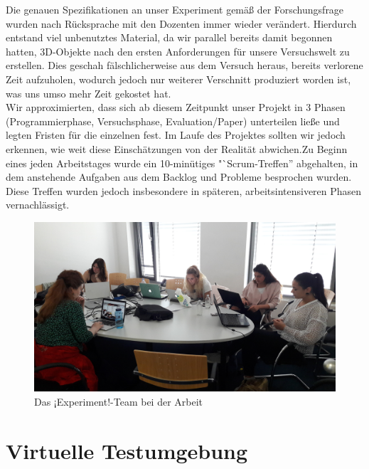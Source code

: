 \documentclass{Bericht}
\begin{document}
		Die genauen Spezifikationen an unser Experiment gemäß der Forschungsfrage wurden nach Rücksprache mit den Dozenten immer wieder verändert. Hierdurch entstand viel unbenutztes Material, da wir parallel bereits damit begonnen hatten, 3D-Objekte nach den ersten Anforderungen für unsere Versuchswelt zu erstellen. Dies geschah fälschlicherweise aus dem Versuch heraus, bereits verlorene Zeit aufzuholen, wodurch jedoch nur weiterer Verschnitt produziert worden ist, was uns umso mehr Zeit gekostet hat.\\
		Wir approximierten, dass sich ab diesem Zeitpunkt unser Projekt in 3 Phasen (Programmierphase, Versuchsphase, Evaluation/Paper) unterteilen ließe und legten Fristen für die einzelnen fest. Im Laufe des Projektes sollten wir jedoch erkennen, wie weit diese Einschätzungen von der Realität abwichen.Zu Beginn eines jeden Arbeitstages wurde ein 10-minütiges "`Scrum-Treffen'' abgehalten, in dem anstehende Aufgaben aus dem Backlog und Probleme besprochen wurden. Diese Treffen wurden jedoch insbesondere in späteren, arbeitsintensiveren Phasen vernachlässigt.\\
		
		\begin{figure}[H] %
			\centering
			\includegraphics[width=\linewidth, height=\textheight, keepaspectratio]{../Bilder/20170518_103125.jpg}
			\caption{Das ¡Experiment!-Team bei der Arbeit}
			\label{img:experiment-team-bei-der-arbeit}
		\end{figure}


\section{Virtuelle Testumgebung}
\end{document}
